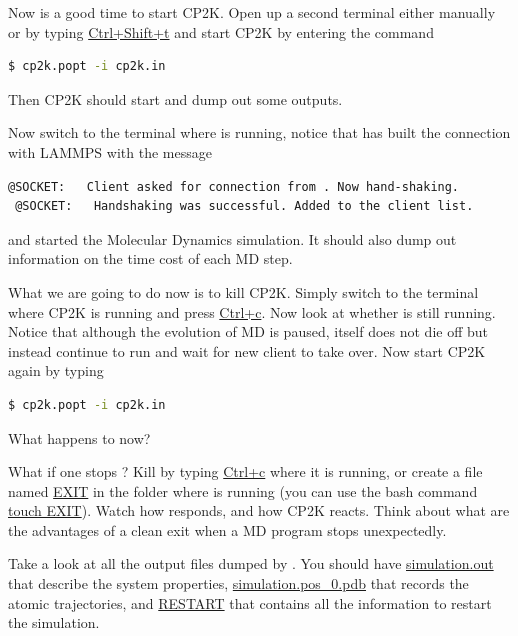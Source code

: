 \documentclass{article}
\begin{document}
\begin{Exercise}[label={i-pi},title={Molecular Dynamics: a client/server approach}]
\Question
Now is a good time to start CP2K. Open up a second terminal either manually or by typing \url{Ctrl+Shift+t} and start CP2K by entering the command
\begin{lstlisting}[language=bash]
$ cp2k.popt -i cp2k.in
\end{lstlisting}
Then CP2K should start and dump out some outputs.

\Question
Now switch to the terminal where \ipi{} is running, notice that \ipi{} has built the connection with LAMMPS with the message
\begin{lstlisting}[language=sh]
 @SOCKET:   Client asked for connection from . Now hand-shaking.
 @SOCKET:   Handshaking was successful. Added to the client list.
\end{lstlisting}
and started the Molecular Dynamics simulation.
It should also dump out information on the time cost of each MD step.

\Question
What we are going to do now is to kill CP2K.
Simply switch to the terminal where CP2K is running and press \url{Ctrl+c}.
Now look at whether \ipi{} is still running.
Notice that although the evolution of MD is paused, \ipi{} itself does not die off but instead continue to run and wait for new client to take over.
Now start CP2K again by typing
\begin{lstlisting}[language=bash]
$ cp2k.popt -i cp2k.in
\end{lstlisting}
What happens to \ipi{} now?

\Question
What if one stops \ipi{}? 
Kill \ipi{} by typing \url{Ctrl+c} where it is running, or create a file named \url{EXIT} in the folder where \ipi{} is running
(you can use the bash command \url{touch EXIT}).
Watch how \ipi{} responds, and how CP2K reacts.
Think about what are the advantages of a clean exit when a MD program stops unexpectedly.

\Question
Take a look at all the output files dumped by \ipi{}.
You should have \url{simulation.out} that describe the system properties,
\url{simulation.pos_0.pdb} that records the atomic trajectories,
and \url{RESTART} that contains all the information to restart the simulation. 
\end{Exercise}
\end{document}
